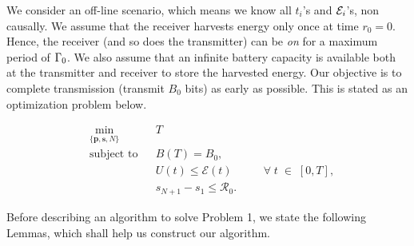 We consider an off-line scenario, which means we know all $t_i$'s and $\mathcal{E}_i$'s, non causally. We assume that the receiver harvests energy only once at time $r_0=0$. Hence, the receiver (and so does the transmitter) can be \textit{on} for a maximum period of $\Gamma_0$. We also assume that an infinite battery capacity is available both at the transmitter and receiver to store the harvested energy. Our objective is to complete transmission (transmit $B_0$ bits) as early as possible. This is stated as an optimization problem below.

\begin{problem}
\begin{align}
&\min_{\{\textbf{p},\textbf{s},N\}}			&& T
\\
&\text{subject to} 				&& B(T)=B_0, 
\label{pb1_constraint_bits}
\\
&     										&& U(t)\le \mathcal{E}(t)  		&&& \forall \; t\;\in\;[0,T], \label{pb1_constraint_energy}
\\
&    										&& s_{N+1}-s_1\le \mathcal{R}_0.
\label{pb1_constraint_time}
\end{align}
\end{problem}
Before describing an algorithm to solve Problem 1, we state the following Lemmas, which shall help us construct our algorithm.



%